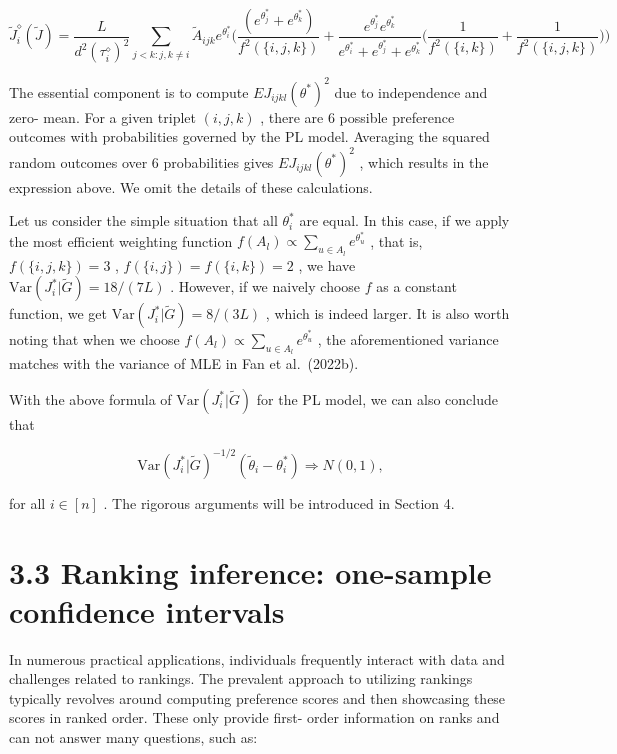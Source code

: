 \[
\widetilde{J}_{i}^{\diamond}(\widetilde{J}) = \frac{L}{d^{2}(\tau_{i}^{\diamond})^{2}}\sum_{j< k:j,k\neq i}\widetilde{A}_{ijk}e^{\theta_{i}^{*}}\Big(\frac{(e^{\theta_{j}^{*}} + e^{\theta_{k}^{*}})}{f^{2}(\{i,j,k\})} +\frac{e^{\theta_{j}^{*}}e^{\theta_{k}^{*}}}{e^{\theta_{i}^{*}} + e^{\theta_{j}^{*}} + e^{\theta_{k}^{*}}}\Big(\frac{1}{f^{2}(\{i,k\})} +\frac{1}{f^{2}(\{i,j,k\})}\Big)\Big)
\]

The essential component is to compute \(EJ_{ijkl}(\theta^{*})^{2}\) due
to independence and zero- mean. For a given triplet \((i,j,k)\) , there
are 6 possible preference outcomes with probabilities governed by the PL
model. Averaging the squared random outcomes over 6 probabilities gives
\(EJ_{ijkl}(\theta^{*})^{2}\) , which results in the expression above.
We omit the details of these calculations.

Let us consider the simple situation that all \(\theta_{i}^{*}\) are
equal. In this case, if we apply the most efficient weighting function
\(f(A_{l})\propto \sum_{u\in A_{l}}e^{\theta_{u}^{*}}\) , that is,
\(f(\{i,j,k\}) = 3\) , \(f(\{i,j\}) = f(\{i,k\}) = 2\) , we have
\(\mathrm{Var}(J_i^* |\widetilde{G}) = 18 / (7L)\) . However, if we
naively choose \(f\) as a constant function, we get
\(\mathrm{Var}(J_i^* |\widetilde{G}) = 8 / (3L)\) , which is indeed
larger. It is also worth noting that when we choose
\(f(A_{l})\propto \sum_{u\in A_{l}}e^{\theta_{u}^{*}}\) , the
aforementioned variance matches with the variance of MLE in Fan et
al.~(2022b).

With the above formula of \(\mathrm{Var}(J_i^* |\widetilde{G})\) for the
PL model, we can also conclude that

\[
\mathrm{Var}(J_i^* |\widetilde{G})^{-1 / 2}(\widetilde{\theta}_i - \theta_i^*)\Rightarrow N(0,1),
\]

for all \(i\in [n]\) . The rigorous arguments will be introduced in
Section 4.

\section{3.3 Ranking inference: one-sample confidence
intervals}\label{ranking-inference-one-sample-confidence-intervals}

In numerous practical applications, individuals frequently interact with
data and challenges related to rankings. The prevalent approach to
utilizing rankings typically revolves around computing preference scores
and then showcasing these scores in ranked order. These only provide
first- order information on ranks and can not answer many questions,
such as:

